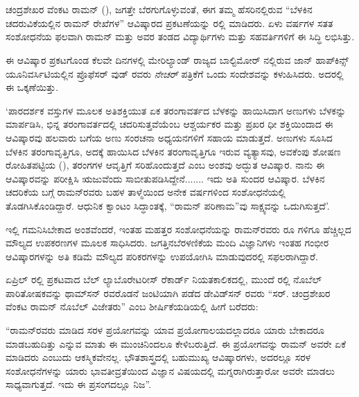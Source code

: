 
\chapter{}


ಚಂದ್ರಶೇಖರ ವೆಂಕಟ ರಾಮನ್ (), ಜಗತ್ತೇ ಬೆರಗುಗೊಳ್ಳುವಂತೆ, ಈಗ ತಮ್ಮ ಹೆಸರಿನಲ್ಲಿರುವ “ಬೆಳಕಿನ ಚದರುವಿಕೆಯಲ್ಲಿನ ರಾಮನ್ ರೇಖೆಗಳ” ಆವಿಷ್ಕಾರದ ಪ್ರಕಟಣೆಯನ್ನು ರಲ್ಲಿ ಮಾಡಿದರು. ಏಳು ವರ್ಷಗಳ ಸತತ ಸಂಶೋಧನೆಯ ಫಲವಾಗಿ ರಾಮನ್ ಮತ್ತು ಅವರ ತಂಡದ ವಿದ್ಯಾರ್ಥಿಗಳು ಮತ್ತು ಸಹವರ್ತಿಗಳಿಗೆ ಈ ಸಿದ್ಧಿ ಲಭಿಸಿತ್ತು.

\vskip 2pt

ಈ ಆವಿಷ್ಕಾರ ಪ್ರಕಟಗೊಂಡ ಕೆಲವೇ ದಿನಗಳಲ್ಲಿ ಮೇರಿಲ್ಯಾಂಡ್ ರಾಜ್ಯದ ಬಾಲ್ಟಿಮೋರ್ ನಲ್ಲಿರುವ ಜಾನ್ ಹಾಪ್‍ಕಿನ್ಸ್ ಯೂನಿವರ್ಸಿಟಿಯಲ್ಲಿನ ಪ್ರೊಫೆಸರ್  ವುಡ್ ರವರು \textit{ನೇಚರ್} ಪತ್ರಿಕೆಗೆ ಒಂದು ಸಂದೇಶವನ್ನು ಕಳುಹಿಸಿದರು. ಅದರಲ್ಲಿ ಈ ಒಕ್ಕಣೆಯಿತ್ತು.

\vskip 2pt

‘ಪಾರದರ್ಶಕ ವಸ್ತುಗಳ ಮೂಲಕ ಅತಿಶಕ್ತಿಯುತ ಏಕ ತರಂಗಾವರ್ತದ ಬೆಳಕನ್ನು ಹಾಯಿಸಿದಾಗ ಅಣುಗಳು ಬೆಳಕನ್ನು ಮಾರ್ಪಡಿಸಿ, ಭಿನ್ನ ತರಂಗಾವರ್ತದಲ್ಲಿ ಚದರಿಸುತ್ತವೆಯೆಂಬ ಆಶ್ಚರ್ಯಕರ ಮತ್ತು ಪ್ರಖರ ಧೀ ಶಕ್ತಿಯಿಂದಾದ ಈ ಆವಿಷ್ಕಾರವು ಹಲವಾರು ಬಗೆಯ ಅಣು ಸಂರಚನಾ ಅಧ್ಯಯನಗಳಿಗೆ ಸಹಾಯ ಮಾಡುತ್ತದೆ. ಅಣುಗಳು ಸೂಸಿದ ಬೆಳಕಿನ ತರಂಗಾವೃತ್ತಿಗೂ, ಅದಕ್ಕೆ ಹಾಯಿಸಿದ ಬೆಳಕಿನ ತರಂಗಾವೃತ್ತಿಗೂ ಇರುವ ವ್ಯತ್ಯಾಸವು, ಅವಕೆಂಪು ಶೋಷಣ ರೋಹಿತಪಟ್ಟಿಯ (), ತರಂಗಗಳ ಆವೃತ್ತಿಗೆ ಸರಿಹೊಂದುತ್ತದೆ ಎಂಬ ಅಂಶವು ಅದ್ಭುತ ಆವಿಷ್ಕಾರ. ನಾನು ಈ ಆವಿಷ್ಕಾರವನ್ನು ಪರೀಕ್ಷಿಸಿ ಋಜುವೆಂದು ಸಾಬೀತುಪಡಿಸಿದ್ದೇನೆ....... ಇದು ಅತಿ ಸುಂದರ ಆವಿಷ್ಕಾರ. ಬೆಳಕಿನ ಚದರಿಕೆಯ ಬಗ್ಗೆ ರಾಮನ್‍ರವರು ಬಹಳ ತಾಳ್ಮೆಯಿಂದ ಅನೇಕ ವರ್ಷಗಳಿಂದ ಸಂಶೋಧನೆಯಲ್ಲಿ ತೊಡಗಿಸಿಕೊಂಡಿದ್ದಾರೆ. ಆಧುನಿಕ ಕ್ವಾಂಟಂ ಸಿದ್ಧಾಂತಕ್ಕೆ, “ರಾಮನ್ ಪರಿಣಾಮ”ವು ಸಾಕ್ಷ್ಯವನ್ನು ಒದುಗಿಸುತ್ತದೆ’.

\vskip 2pt

ಇಲ್ಲಿ ಗಮನಿಸಿಬೇಕಾದ ಅಂಶವೆಂದರೆ, ಇಂತಹ ಮಹತ್ತರ ಸಂಶೋಧನೆಯನ್ನು ರಾಮನ್‍\break ರವರು  ರೂ ಗಳಿಗೂ ಹೆಚ್ಚಿಲ್ಲದ ಮೌಲ್ಯದ ಉಪಕರಣಗಳ ಮೂಲಕ ಸಾಧಿಸಿದರು. ಜಗತ್ತಿನ\break ಬೆರಳಣಿಕೆಯ ಮಂದಿ ವಿಜ್ಞಾನಿಗಳು ಇಂತಹ ಗಂಭೀರ ಆವಿಷ್ಕಾರಗಳನ್ನು ಅತಿ ಕಡಿಮೆ ಮೌಲ್ಯದ ಪರಿಕರಗಳನ್ನು ಉಪಯೋಗಿಸಿ ಮಾಡುವುದರಲ್ಲಿ ಸಫಲರಾಗಿದ್ದಾರೆ.

ಏಪ್ರಿಲ್ ರಲ್ಲಿ ಪ್ರಕಟವಾದ ಬೆಲ್ ಲ್ಯಾಬೊರೇಟರೀಸ್ ರೆಕಾರ್ಡ್ ನಿಯತಕಾಲಿಕದಲ್ಲಿ, ಮುಂದೆ ರಲ್ಲಿ ನೊಬೆಲ್ ಪಾರಿತೋಷಕವನ್ನು  ಥಾಮ್‍ಸನ್ ರವರೊಡನೆ ಜಂಟಿಯಾಗಿ ಪಡೆದ  ಡೇವಿಡ್‍ಸನ್ ರವರು “ಸರ್. ಚಂದ್ರಶೇಖರ ವೆಂಕಟ ರಾಮನ್ ನೊಬೆಲ್ ವಿಜೇತರು” ಎಂಬ ಶೀರ್ಷಿಕೆಯಡಿಯಲ್ಲಿ ಹೀಗೆ ಬರೆದರು:\enginline{-}

“ರಾಮನ್‍ರವರು ಮಾಡಿದ ಸರಳ ಪ್ರಯೋಗವನ್ನು ಯಾವ ಪ್ರಯೋಗಾಲಯದಲ್ಲಾದರೂ ಯಾರು ಬೇಕಾದರೂ ಮಾಡಬಹುದಿತ್ತು ಎನ್ನುವ ಮಾತು ಈ ಮುಂಚಿನಿಂದಲೂ ಕೇಳಿಬರುತ್ತಿದೆ. ಈ ಪ್ರಯೋಗವನ್ನು ರಾಮನ್ ಅವರೇ ಏಕೆ ಮಾಡಿದರು ಎಂಬುದು ಆಕಸ್ಮಿಕವೇನಲ್ಲ. ಭೌತಶಾಸ್ತ್ರದಲ್ಲಿ ಬಹುಮುಖ್ಯ ಆವಿಷ್ಕಾರಗಳು, ಅದರಲ್ಲೂ ಸರಳ ಸಂಶೋಧನೆಗಳನ್ನು ಯಾರು ಭಾವತೀವ್ರತೆಯಿಂದ ವಿಜ್ಞಾನ ವಿಷಯದಲ್ಲಿ ಮಗ್ನರಾಗಿರುತ್ತಾರೋ ಅವರೇ ಮಾಡಲು ಸಾಧ್ಯವಾಗುತ್ತದೆ. ಇದು ಈ ಪ್ರಸಂಗದಲ್ಲೂ ನಿಜ”.

